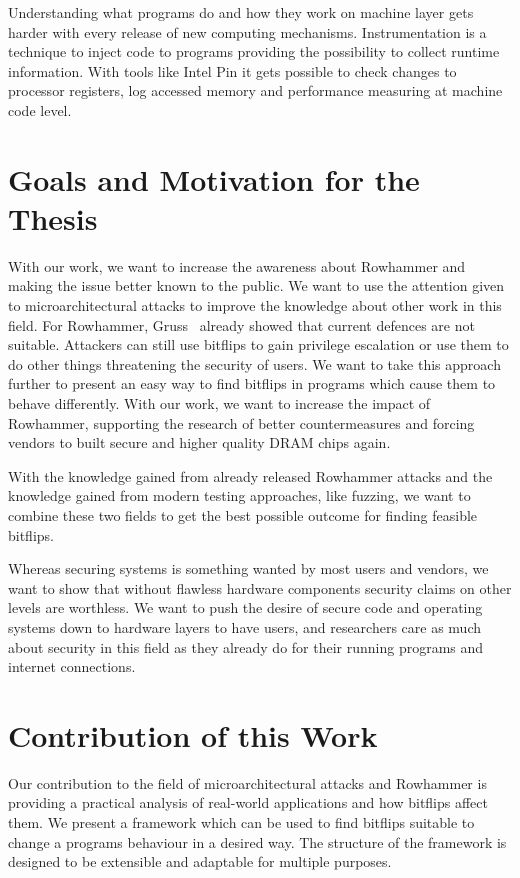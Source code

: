 Understanding what programs do and how they work on machine layer gets harder
with every release of new computing mechanisms. Instrumentation is a technique
to inject code to programs providing the possibility to collect runtime
information. With tools like Intel Pin\cite{pintool} it gets possible to check
changes to processor registers, log accessed memory and performance measuring at
machine code level.

\section{Goals and Motivation for the Thesis}

With our work, we want to increase the awareness about Rowhammer and making the
issue better known to the public. We want to use the attention given to
microarchitectural attacks to improve the knowledge about other work in this
field. For Rowhammer, Gruss~\etal\cite{flipinthewall} already showed that
current defences are not suitable. Attackers can still use bitflips to gain
privilege escalation or use them to do other things threatening the security of
users. We want to take this approach further to present an easy way to find
bitflips in programs which cause them to behave differently. With our work, we
want to increase the impact of Rowhammer, supporting the research of better
countermeasures and forcing vendors to built secure and higher quality DRAM
chips again.

With the knowledge gained from already released Rowhammer attacks and the
knowledge gained from modern testing approaches, like fuzzing, we want to
combine these two fields to get the best possible outcome for finding feasible
bitflips.

Whereas securing systems is something wanted by most users and vendors, we want
to show that without flawless hardware components security claims on other
levels are worthless. We want to push the desire of secure code and operating
systems down to hardware layers to have users, and researchers care as much
about security in this field as they already do for their running programs and
internet connections.

\section{Contribution of this Work}

Our contribution to the field of microarchitectural attacks and Rowhammer is
providing a practical analysis of real-world applications and how bitflips
affect them. We present a framework which can be used to find bitflips suitable
to change a program\textquotesingle s behaviour in a desired way. The structure
of the framework is designed to be extensible and adaptable for multiple
purposes.

